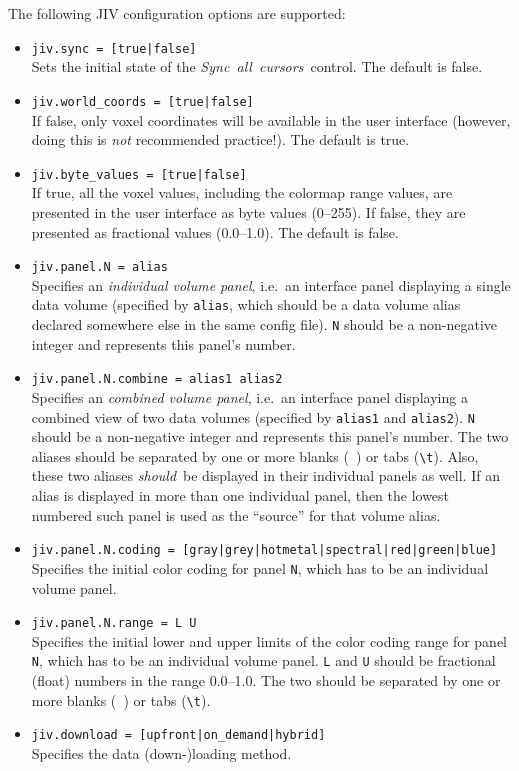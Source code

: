 The following JIV configuration options are supported:
\begin{itemize}
\item \verb+jiv.sync = [true|false]+ \\
  Sets the initial state of the \mbox{\em Sync all cursors}\ control.
  The default is false.
\item \verb+jiv.world_coords = [true|false]+ \\
  If false, only voxel coordinates will be available in the user
  interface (however, doing this is \emph{not} recommended practice!).
  The default is true.
\item \verb+jiv.byte_values = [true|false]+ \\
  If true, all the voxel values, including the colormap range values,
  are presented in the user interface as byte values (0--255). If
  false, they are presented as fractional values (0.0--1.0). The
  default is false.
\item \verb+jiv.panel.N = alias+ \\
  Specifies an {\em individual volume panel}, i.e.\ an interface panel
  displaying a single data volume (specified by \verb+alias+, which
  should be a data volume alias declared somewhere else in the same
  config file).  \verb+N+ should be a non-negative integer and
  represents this panel's number.
\item \verb+jiv.panel.N.combine = alias1 alias2+ \\
  Specifies an {\em combined volume panel}, i.e.\ an interface panel
  displaying a combined view of two data volumes (specified by
  \verb+alias1+ and \verb+alias2+). \verb+N+ should be a non-negative
  integer and represents this panel's number. The two aliases should
  be separated by one or more blanks (\verb*+ +) or tabs (\verb+\t+).
  Also, these two aliases {\em should}\ be displayed in their
  individual panels as well. If an alias is displayed in more than one
  individual panel, then the lowest numbered such panel is used as the
  ``source'' for that volume alias.
\item \verb+jiv.panel.N.coding = [gray|grey|hotmetal|spectral|red|green|blue]+ \\
  Specifies the initial color coding for panel \verb+N+, which has to
  be an individual volume panel.
\item \verb+jiv.panel.N.range = L U+ \\
  Specifies the initial lower and upper limits of the color coding
  range for panel \verb+N+, which has to be an individual volume
  panel. \verb+L+ and \verb+U+ should be fractional (float) numbers in
  the range 0.0--1.0.  The two should be separated by one or more
  blanks (\verb*+ +) or tabs (\verb+\t+).
\item \verb+jiv.download = [upfront|on_demand|hybrid]+ \\
  Specifies the data (down-)loading method. 


\end{itemize}

